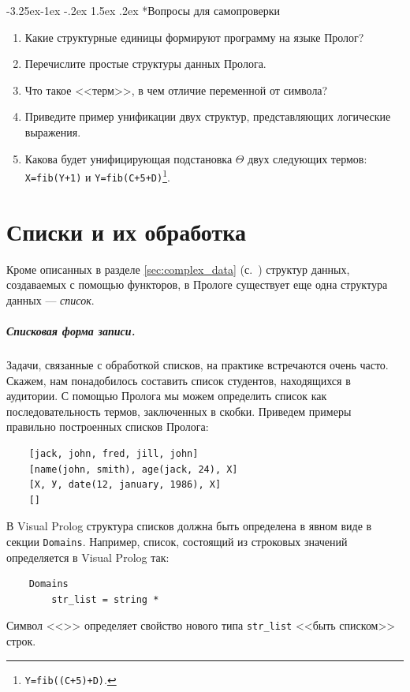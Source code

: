 \documentclass[12pt, openany, twoside]{book} %
\makeatletter
\renewcommand\subsubsection{\@startsection{subsubsection}{3}{\z@}%
                                     {-3.25ex\@plus -1ex \@minus -.2ex}%
                                     {1.5ex \@plus .2ex}%
                                     {\normalfont\normalsize\bfseries}}
\newenvironment{questions}{\subsubsection*{Вопросы для самопроверки}\begin{enumerate}}{\end{enumerate}}
\makeatother
\begin{document}
\begin{questions}
\item{} Какие структурные единицы формируют программу на языке Пролог?
\item{} Перечислите простые структуры данных Пролога.
\item{} Что такое <<терм>>, в чем отличие переменной от символа?
\item{} Приведите пример унификации двух структур, представляющих логические выражения.
\item{} Какова будет унифицирующая подстановка $\Theta$ двух следующих термов: \texttt{X=fib(Y+1)} и \texttt{Y=fib(C+5+D)}\footnote{\texttt{Y=fib((C+5)+D)}.}.
\end{questions}

\chapter{Списки и их обработка}

Кроме описанных в разделе \ref{sec:complex_data} (с.~\pageref{sec:complex_data}) структур данных, создаваемых с помощью функторов, в Прологе существует еще одна структура данных --- {\em список}.

\paragraph{Списковая форма записи.} Задачи, связанные с обработкой списков, на практике встречаются очень часто. Скажем, нам понадобилось составить список студентов, находящихся в аудитории. С помощью Пролога мы можем определить список как последовательность термов, заключенных в скобки. Приведем примеры правильно построенных списков Пролога:

{\tt\begin{verbatim}
    [jack, john, fred, jill, john]
    [name(john, smith), age(jack, 24), X]
    [Х, У, date(12, january, 1986), Х]
    []
\end{verbatim}}
\noindent В Visual Prolog структура списков должна быть определена в явном виде в секции {\tt Domains}. Например, список, состоящий из строковых значений определяется в Visual Prolog так:
{\tt\begin{verbatim}
    Domains
        str_list = string *
\end{verbatim}}
\noindent Символ <<{\tt *}>> определяет свойство нового типа {\tt str\_list} <<быть списком>> строк.
\end{document}
